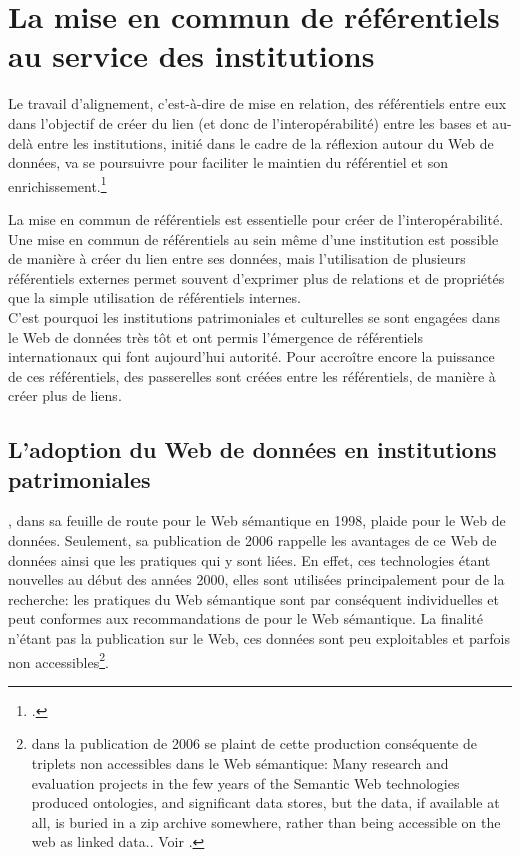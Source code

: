 \section{\label{II-A-2}La mise en commun de référentiels au service des institutions}

\begin{citationLongue}
	Le travail d’alignement, c’est-à-dire de mise en relation, des référentiels entre eux dans l’objectif de créer du lien (et donc de l’interopérabilité) entre les bases et au-delà entre les institutions, initié dans le cadre de la réflexion autour du Web de données, va se poursuivre pour faciliter le maintien du référentiel et son enrichissement.\footcite{poupeau_reflexions_2018}
\end{citationLongue}
\medskip
La mise en commun de référentiels est essentielle pour créer de l'interopérabilité. Une mise en commun de référentiels au sein même d'une institution est possible de manière à créer du lien entre ses données, mais l'utilisation de plusieurs référentiels externes permet souvent d'exprimer plus de relations et de propriétés que la simple utilisation de référentiels internes.\\

C'est pourquoi les institutions patrimoniales et culturelles se sont engagées dans le Web de données très tôt et ont permis l'émergence de référentiels internationaux qui font aujourd'hui autorité. Pour accroître encore la puissance de ces référentiels, des passerelles sont créées entre les référentiels, de manière à créer plus de liens.

\subsection{\label{II-A-2-a}L'adoption du Web de données en institutions patrimoniales}

, dans sa feuille de route pour le Web sémantique en 1998, plaide pour le Web de données. Seulement, sa publication de 2006 rappelle les avantages de ce Web de données ainsi que les pratiques qui y sont liées. En effet, ces technologies étant nouvelles au début des années 2000, elles sont utilisées principalement pour de la recherche: les pratiques du Web sémantique sont par conséquent individuelles et peut conformes aux recommandations de  pour le Web sémantique. La finalité n'étant pas la publication sur le Web, ces données sont peu exploitables et parfois non accessibles\footnote{ dans la publication de 2006 se plaint de cette production conséquente de triplets non accessibles dans le Web sémantique: \og Many research and evaluation projects in the few years of the Semantic Web technologies produced ontologies, and significant data stores, but the data, if available at all, is buried in a zip archive somewhere, rather than being accessible on the web as linked data.\fg{}. Voir \cite{berners-lee_linked_2006}.}.\\

